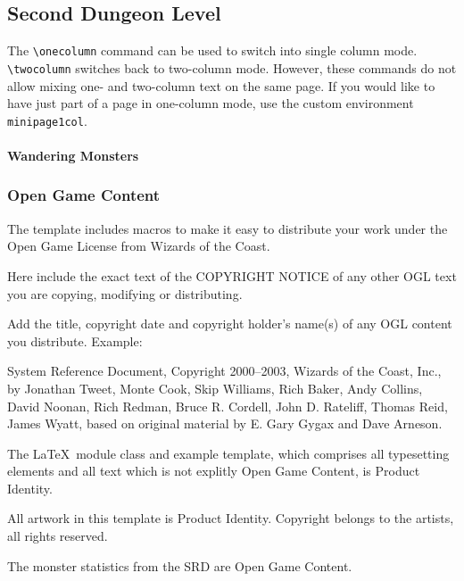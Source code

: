 \documentclass[a4paper]{module}
\begin{document}
\begin{minipage1col}[b]
\part{Second Dungeon Level}

The \texttt{\textbackslash onecolumn} command can be used to switch into single column mode. \texttt{\textbackslash twocolumn} switches back to two-column mode. However,
these commands do not allow mixing one- and two-column text on the same page. If you would like to have just part of a page in one-column mode, use the custom
environment \texttt{minipage1col}.

\subsection{Wandering Monsters}

\lipsum
\end{minipage1col}

\lipsum

\section{Open Game Content}

The template includes macros to make it easy to distribute your work under the Open Game License from Wizards of the Coast.

\begin{ogl}
\item Here include the exact text of the COPYRIGHT NOTICE of any other OGL text you are copying, modifying or distributing.
\item Add the title, copyright date and copyright holder's name(s) of any OGL content you distribute. Example:
\item System Reference Document, Copyright 2000--2003, Wizards of the Coast, Inc., by Jonathan Tweet, Monte Cook, Skip Williams, Rich Baker, Andy Collins,
David Noonan, Rich Redman, Bruce R. Cordell, John D. Rateliff, Thomas Reid, James Wyatt, based on original material by E. Gary Gygax and Dave Arneson.
\end{ogl}

\begin{productidentity}
\item The \LaTeX~module class and example template, which comprises all typesetting elements and all text which is not explitly Open Game Content, is Product Identity.
\modulecopyright

\item All artwork in this template is Product Identity. Copyright belongs to the artists, all rights reserved.
\end{productidentity}

\begin{opengamecontent}
\item The monster statistics from the SRD are Open Game Content.
\end{opengamecontent}
\end{document}
